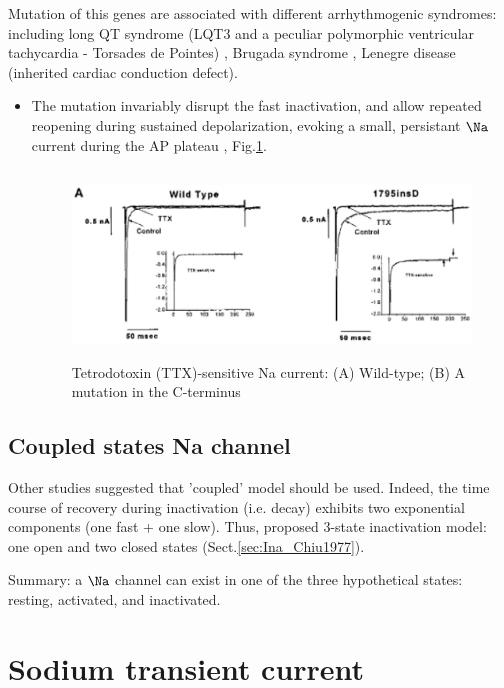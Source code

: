 Mutation of this genes are associated with different arrhythmogenic syndromes:
including long QT syndrome (LQT3 and a peculiar polymorphic ventricular
tachycardia - Torsades de Pointes) \citep{wang1995, wang1995scn5a}, Brugada
syndrome \citep{weiss2002}, Lenegre disease (inherited cardiac conduction
defect).
\begin{itemize}
  \item  The mutation invariably disrupt the fast inactivation, and allow repeated
reopening during sustained depolarization, evoking a small, persistant $\Na$
current during the AP plateau \citep{Balser2001}, Fig.\ref{fig:I_Na_mutation}.

\begin{figure}[hbt]
  \centerline{\includegraphics[height=5cm,
    angle=0]{./images/I_Na_mutation.eps}}
  \caption{Tetrodotoxin (TTX)-sensitive Na current: (A) Wild-type; (B) A
  mutation in the C-terminus}
  \label{fig:I_Na_mutation}
\end{figure}
  
\end{itemize}


\subsection{Coupled states Na channel}

Other studies suggested that 'coupled' model should be used. Indeed, the time
course of recovery during inactivation (i.e.
decay) exhibits two exponential components (one fast + one slow). Thus,
\citep{chiu1977} proposed 3-state inactivation model: one open and two closed
states (Sect.\ref{sec:Ina_Chiu1977}).

Summary: a $\Na$ channel can exist in one of the three hypothetical states:
resting, activated, and inactivated.
\section{Sodium transient current}
\label{sec:transient-sodium-current}

